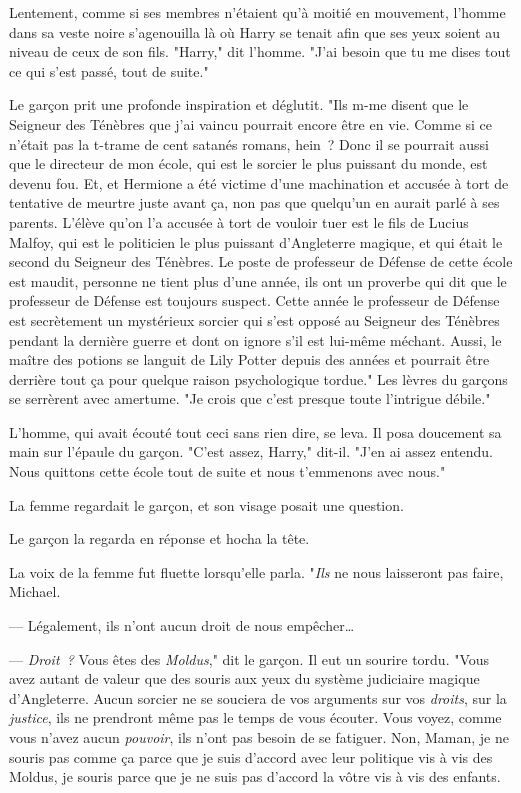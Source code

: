 Lentement, comme si ses membres n'étaient qu'à moitié en mouvement, l'homme dans sa veste noire s'agenouilla là où Harry se tenait afin que ses yeux soient au niveau de ceux de son fils. "Harry," dit l'homme. "J'ai besoin que tu me dises tout ce qui s'est passé, tout de suite."

Le garçon prit une profonde inspiration et déglutit. "Ils m-me disent que le Seigneur des Ténèbres que j'ai vaincu pourrait encore être en vie. Comme si ce n'était pas la t-trame de cent satanés romans, hein~? Donc il se pourrait aussi que le directeur de mon école, qui est le sorcier le plus puissant du monde, est devenu fou. Et, et Hermione a été victime d'une machination et accusée à tort de tentative de meurtre juste avant ça, non pas que quelqu'un en aurait parlé à ses parents. L'élève qu'on l'a accusée à tort de vouloir tuer est le fils de Lucius Malfoy, qui est le politicien le plus puissant d'Angleterre magique, et qui était le second du Seigneur des Ténèbres. Le poste de professeur de Défense de cette école est maudit, personne ne tient plus d'une année, ils ont un proverbe qui dit que le professeur de Défense est toujours suspect. Cette année le professeur de Défense est secrètement un mystérieux sorcier qui s'est opposé au Seigneur des Ténèbres pendant la dernière guerre et dont on ignore s'il est lui-même méchant. Aussi, le maître des potions se languit de Lily Potter depuis des années et pourrait être derrière tout ça pour quelque raison psychologique tordue." Les lèvres du garçons se serrèrent avec amertume. "Je crois que c'est presque toute l'intrigue débile."

L'homme, qui avait écouté tout ceci sans rien dire, se leva. Il posa doucement sa main sur l'épaule du garçon. "C'est assez, Harry," dit-il. "J'en ai assez entendu. Nous quittons cette école tout de suite et nous t'emmenons avec nous."

La femme regardait le garçon, et son visage posait une question.

Le garçon la regarda en réponse et hocha la tête.

La voix de la femme fut fluette lorsqu'elle parla. "\emph{Ils} ne nous laisseront pas faire, Michael.

--- Légalement, ils n'ont aucun droit de nous empêcher…

--- \emph{Droit~?} Vous êtes des \emph{Moldus}," dit le garçon. Il eut un sourire tordu. "Vous avez autant de valeur que des souris aux yeux du système judiciaire magique d'Angleterre. Aucun sorcier ne se souciera de vos arguments sur vos \emph{droits}, sur la \emph{justice}, ils ne prendront même pas le temps de vous écouter. Vous voyez, comme vous n'avez aucun \emph{pouvoir}, ils n'ont pas besoin de se fatiguer. Non, Maman, je ne souris pas comme ça parce que je suis d'accord avec leur politique vis à vis des Moldus, je souris parce que je ne suis pas d'accord la vôtre vis à vis des enfants.

